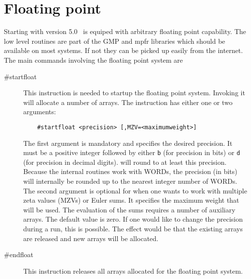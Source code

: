 
\chapter{Floating point}
\label{floatingpoint}

Starting with version 5.0 \FORM\ is equiped with arbitrary floating point 
capability. The low level routines are part of the GMP and mpfr libraries 
which should be available on most systems. If not they can be picked up 
easily from the internet. The main commands involving the floating point 
system are
\begin{description}
\item[\#startfloat] This instruction is needed to startup the floating 
point system. Invoking it will allocate a number of arrays. The instruction 
has either one or two arguments:
\begin{verbatim}
    #startfloat <precision> [,MZV=<maximumweight>]
\end{verbatim}
The first argument is mandatory and specifies the desired precision. It must 
be a positive integer followed by either \texttt{b} (for precision in bits) 
or \texttt{d} (for precision in decimal digits).
\FORM{} will round to at least this precision. Because the internal 
routines work with WORDs, the precision (in bits) will internally be rounded up to the nearest 
integer number of WORDs. The second argument is optional for when one wants 
to work with multiple zeta values (MZVs) or Euler sums. It specifies the 
maximum weight that will be used. The evaluation of the sums requires a 
number of auxiliary arrays. The default value is zero. If one would like to 
change the precision during a run, this is possible. The effect would be 
that the existing arrays are released and new arrays will be allocated.
\item[\#endfloat] This instruction releases all arrays allocated for the 
floating point system.
\end{description}
